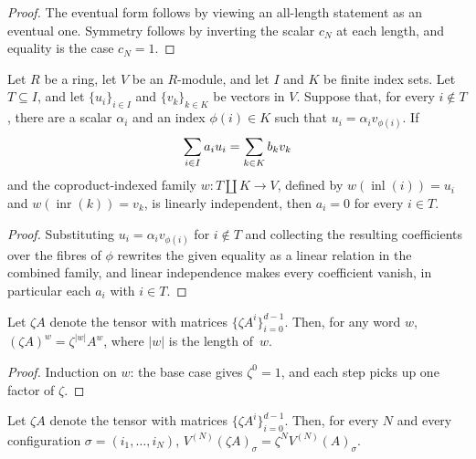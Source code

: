 \begin{proof}
    \leanok
    The eventual form follows by viewing an all-length statement as an
    eventual one.
    Symmetry follows by inverting the scalar $c_N$ at each length, and equality
    is the case $c_N = 1$.
\end{proof}

\begin{lemma}
    \label{lem:finite_coefficient_isolation}
    \leanok
    Let $R$ be a ring, let $V$ be an $R$-module, and let $I$ and $K$ be
    finite index sets. Let $T\subseteq I$, and let
    $\{u_i\}_{i\in I}$ and $\{v_k\}_{k\in K}$ be vectors in $V$. Suppose
    that, for every $i\notin T$, there are a scalar $\alpha_i$ and an index
    $\phi(i)\in K$ such that $u_i=\alpha_i v_{\phi(i)}$. If
    \begin{align}
        \sum_{i\in I}a_i u_i=\sum_{k\in K}b_k v_k
        \notag
    \end{align}
    and the coproduct-indexed family $w\colon T\amalg K\to V$, defined by
    $w(\operatorname{inl}(i))=u_i$ and
    $w(\operatorname{inr}(k))=v_k$, is linearly independent, then
    $a_i=0$ for every $i\in T$.
\end{lemma}
\begin{proof}\leanok
    Substituting $u_i=\alpha_i v_{\phi(i)}$ for $i\notin T$ and collecting the
    resulting coefficients over the fibres of $\phi$ rewrites the given
    equality as a linear relation in the combined family, and linear
    independence makes every coefficient vanish, in particular each $a_i$ with
    $i\in T$.
\end{proof}

\begin{lemma}\label{lem:eval_word_smul}
    \leanok
    Let $\zeta A$ denote the tensor with matrices
    $\{\zeta A^i\}_{i=0}^{d-1}$. Then, for any word $w$,
    $(\zeta A)^w = \zeta^{|w|} A^w$, where $|w|$ is the length of~$w$.
\end{lemma}

\begin{proof}\leanok
    Induction on $w$: the base case gives $\zeta^0 = 1$,
    and each step picks up one factor of $\zeta$.
\end{proof}

\begin{lemma}\label{lem:mpv_smul}
    \leanok
    Let $\zeta A$ denote the tensor with matrices
    $\{\zeta A^i\}_{i=0}^{d-1}$. Then, for every $N$ and every configuration
    $\sigma = (i_1, \ldots, i_N)$,
    $V^{(N)}(\zeta A)_\sigma = \zeta^{N} V^{(N)}(A)_\sigma$.
\end{lemma}

